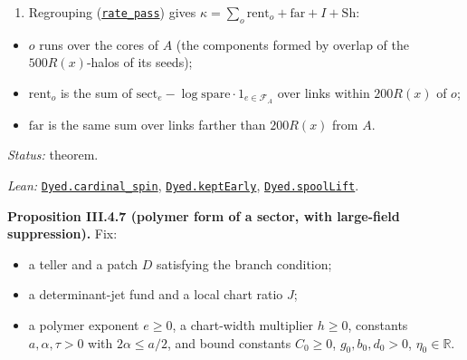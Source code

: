 \documentclass[
  letterpaper,
  11pt]{article}
\providecommand{\tightlist}{%
  \setlength{\itemsep}{0pt}\setlength{\parskip}{0pt}}
\begin{document}
\begin{enumerate}
\def\labelenumi{(\roman{enumi})}
\setcounter{enumi}{3}
\tightlist
\item
  Regrouping
  (\href{https://github.com/yang-mills-group/OpenAI-YM-20261028/blob/3456e5e75cf8d4cd558955a5c7638fba2d68f464/YM/PhysicalNext/AFTERNOON_INTERACTING_RANK_COMPARISON/Opacity/Enigma.lean\#L36-L48}{\texttt{rate\_pass}})
  gives \(\kappa=\sum_{o}\mathrm{rent}_o+\mathrm{far}+I+\mathrm{Sh}\):
\end{enumerate}

\begin{itemize}
\tightlist
\item
  \(o\) runs over the cores of \(A\) (the components formed by overlap
  of the \(500R(x)\)-halos of its seeds);
\item
  \(\mathrm{rent}_o\) is the sum of
  \(\mathrm{sect}_e-\log\mathrm{spare}\cdot1_{e\in\mathcal F_A}\) over
  links within \(200R(x)\) of \(o\);
\item
  \(\mathrm{far}\) is the same sum over links farther than \(200R(x)\)
  from \(A\).
\end{itemize}

\emph{Status:} theorem.

\emph{Lean:}
\href{https://github.com/yang-mills-group/OpenAI-YM-20261028/blob/3456e5e75cf8d4cd558955a5c7638fba2d68f464/YM/PhysicalNext/AFTERNOON_INTERACTING_RANK_COMPARISON/Opacity/Prism.lean\#L102-L168}{\texttt{Dyed.cardinal\_spin}},
\href{https://github.com/yang-mills-group/OpenAI-YM-20261028/blob/3456e5e75cf8d4cd558955a5c7638fba2d68f464/YM/PhysicalNext/AFTERNOON_INTERACTING_RANK_COMPARISON/Opacity/Prism.lean\#L50-L54}{\texttt{Dyed.keptEarly}},
\href{https://github.com/yang-mills-group/OpenAI-YM-20261028/blob/3456e5e75cf8d4cd558955a5c7638fba2d68f464/YM/PhysicalNext/AFTERNOON_INTERACTING_RANK_COMPARISON/Opacity/Prism.lean\#L56-L63}{\texttt{Dyed.spoolLift}}.

\textbf{Proposition III.4.7 (polymer form of a sector, with large-field
suppression).} Fix:

\begin{itemize}
\tightlist
\item
  a teller and a patch \(D\) satisfying the branch condition;
\item
  a determinant-jet fund and a local chart ratio \(J\);
\item
  a polymer exponent \(e\ge0\), a chart-width multiplier \(h\ge0\),
  constants \(a,\alpha,\tau>0\) with \(2\alpha\le a/2\), and bound
  constants \(C_0\ge0\), \(g_0,b_0,d_0>0\), \(\eta_0\in\mathbb R\).
\end{itemize}
\end{document}

